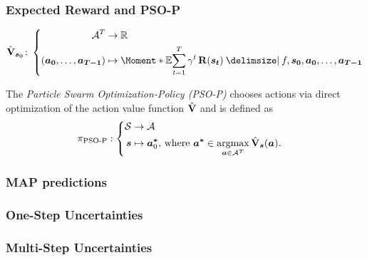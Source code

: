 \begin{frame}[label=solution_psop]
    \frametitle{Expected Reward and PSO-P}

    \begin{align}
        \label{eq:action_value_function}
        \AVlu_{\mat{s_0}} \colon \left\{
            \begin{aligned}
                \Ah^T &\to \R \\
                \left( \mat{a_0}, \dots, \mat{a_{T-1}} \right) &\mapsto \Moment*{\E}{\sum_{t=1}^T \gamma^t \Rwd(\mat{s_t}) \given f, \mat{s_0}, \mat{a_0}, \dots, \mat{a_{T-1}}}
            \end{aligned}
            \right.
        \end{align}

    \begin{definition}[PSO-P]
        \label{def:psop}
        The \emph{Particle Swarm Optimization-Policy (PSO-P)} chooses actions via direct optimization of the action value function $\operatorname{\hat{\operatorname{\mathbf{V}}}}$ and is defined as
        \begin{align}
            \pi_{\text{PSO-P}} &: \left\{
            \begin{aligned}
                \mathcal{S} &\to \mathcal{A}\\
                \bm{s} &\mapsto \bm{a^\ast}_0 \text{, where } \bm{a^\ast} \in \operatorname*{argmax}_{\bm{a} \in \mathcal{A}^T} \operatorname{\hat{\operatorname{\mathbf{V}}}}_{\bm{s}}(\bm{a}).
            \end{aligned}
            \right.
        \end{align}
    \end{definition}
\end{frame}

\begin{frame}[label=solution_map]
    \frametitle{MAP predictions}

    \centering
     {
    }
     {
    }
\end{frame}

\begin{frame}[label=solution_os]
    \frametitle{One-Step Uncertainties}

    \centering
     {
    }
     {
    }
\end{frame}

\begin{frame}[label=solution_ms]
    \frametitle{Multi-Step Uncertainties}

    \centering
     {
    }
     {
    }
\end{frame}

